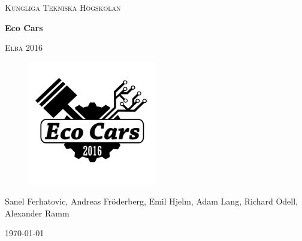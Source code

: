 \documentclass[a4paper, 12pt]{report}
\begin{document}

\begin{titlepage}
	\centering
	{\scshape Kungliga Tekniska Högskolan \par}
	\vspace{2cm}
    {\huge\bfseries Eco Cars\par}
	\vspace{0.5cm}
	{\scshape\Large Elba 2016\par}
	\vspace{1.5cm}
	\begin{figure}[H]
    \centering\label{fig:ECO}
    \includegraphics[width=0.5\textwidth]{./img/ECOCARS}
\end{figure}

    {\Large\itshape{Sanel Ferhatovic, Andreas Fröderberg, Emil Hjelm, Adam Lang,
    Richard Odell, Alexander Ramm \par}}
	\vfill
	\vfill

	{\large \today\par}
\end{titlepage}


\begin{abstract}
A hybrid vehicle, built to compete in Shell Eco-Marathon, was upgraded and modified to run on ethanol. In addition an optimal speed trajectory controller where designed and implemented to minimize energy consumption.
A roling highway, or a test rig, where designed and constructed to be able to test the cars performance on any, simulated, track's high-profile. 
The theoretical performance was evaluated, which estimated that the car would have a mileage of 197 km/litre ethanol if run on the competition track.
\end{abstract}
\clearpage
\setcounter{page}{3}
\end{document}
